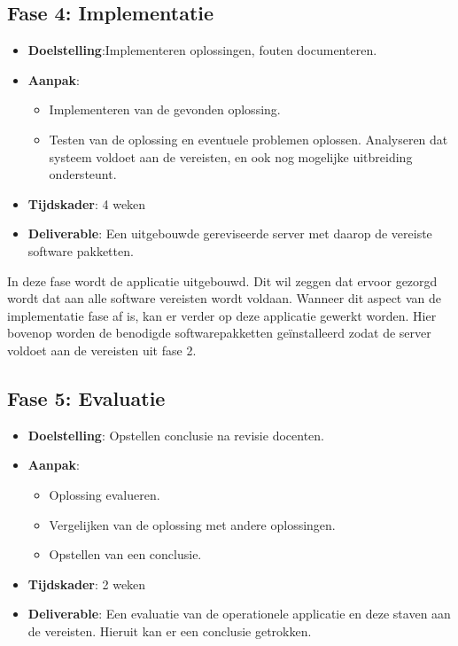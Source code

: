 \documentclass{hogent-article}
\begin{document}
\subsection*{Fase 4: Implementatie}
\begin{itemize}
\item \textbf{Doelstelling}:Implementeren oplossingen, fouten documenteren.
\item \textbf{Aanpak}:
\begin{itemize}
\item Implementeren van de gevonden oplossing.
\item Testen van de oplossing en eventuele problemen oplossen. Analyseren dat systeem voldoet aan de vereisten, en ook nog mogelijke uitbreiding ondersteunt.
\end{itemize}
\item \textbf{Tijdskader}: 4 weken
\item \textbf{Deliverable}: Een uitgebouwde ge\-re\-vi\-seer\-de server met daarop de vereiste software pakketten.
\end{itemize}
\bigbreak
In deze fase wordt de applicatie uitgebouwd. Dit wil zeggen dat ervoor gezorgd wordt dat aan alle software vereisten wordt voldaan. Wanneer dit aspect van de implementatie fase af is, kan er verder op deze applicatie gewerkt worden. Hier bovenop worden de benodigde softwarepakketten geïnstalleerd zodat de server voldoet aan de vereisten uit fase 2.
\bigskip
\subsection*{Fase 5: Evaluatie}
\begin{itemize}
\item \textbf{Doelstelling}: Opstellen conclusie na revisie docenten.
\item \textbf{Aanpak}:
\begin{itemize}
\item Oplossing evalueren.
\item Vergelijken van de oplossing met andere oplossingen.
\item Opstellen van een conclusie.
\end{itemize}
\item \textbf{Tijdskader}: 2 weken
\item \textbf{Deliverable}: Een evaluatie van de operationele applicatie en deze staven aan de vereisten. Hieruit kan er een conclusie getrokken.
\end{itemize}
\end{document}
